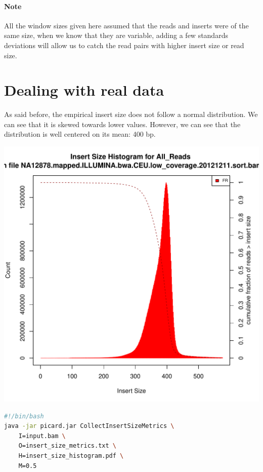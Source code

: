 \documentclass{article}
\begin{document}
\paragraph{Note} All the window sizes given here assumed that the reads and inserts were of the same size, when we know that they are variable, adding a few standards deviations will allow us to catch the read pairs with higher insert size or read size. \cite{pham_efficient_2018}

\section{Dealing with real data}

As said before, the empirical insert size does not follow a normal distribution. We can see that it is skewed towards lower values. However, we can see that the distribution is well centered on its mean: 400 bp.

\includegraphics[width=\textwidth]{insert_size_histogram}

\begin{lstlisting}[language=bash,caption={Picard command}]
#!/bin/bash
java -jar picard.jar CollectInsertSizeMetrics \
    I=input.bam \
    O=insert_size_metrics.txt \
    H=insert_size_histogram.pdf \
    M=0.5
\end{lstlisting}
\end{document}
